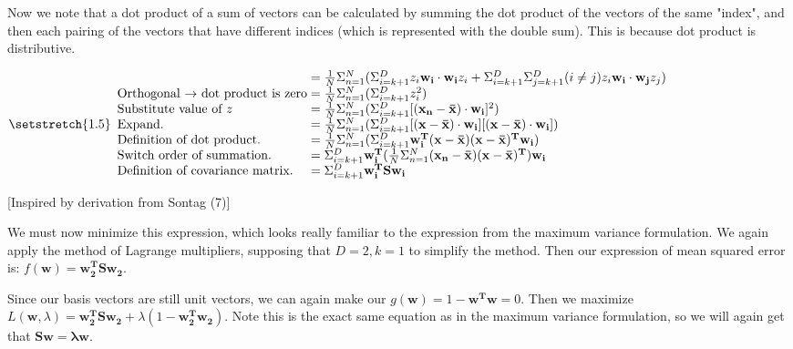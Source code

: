 \documentclass{article}
\begin{document}
\vspace{2mm}
\noindent Now we note that a dot product of a sum of vectors can be calculated by summing the dot product of the vectors of the same "index", and then each pairing of the vectors that have different indices (which is represented with the double sum). This is because dot product is distributive.

$
\setstretch{1.5}
\begin{array}{l@{{}\mathrel{=}{}}l}
    &\frac{1}{N}\Sigma_{n=1}^{N}(\Sigma_{i=k+1}^{D}z_i\mathbf{w_i}\cdot\mathbf{w_i}z_i + \Sigma_{i=k+1}^{D} \Sigma_{j=k+1}^{D}(i\neq j)z_i\mathbf{w_i \cdot w_j}z_j)\\
    \text{Orthogonal $\rightarrow$ dot product is zero}&\frac{1}{N}\Sigma_{n=1}^{N}(\Sigma_{i=k+1}^{D}z_{i}^2)\\
    \text{Substitute value of $z$}&\frac{1}{N}\Sigma_{n=1}^{N}(\Sigma_{i=k+1}^{D}[(\mathbf{x_n - \bar{x}}) \cdot \mathbf{w_i}]^2)\\
    \text{Expand.}&\frac{1}{N}\Sigma_{n=1}^{N}(\Sigma_{i=k+1}^{D}[(\mathbf{x - \bar{x}})\cdot \mathbf{w_i}][(\mathbf{x - \bar{x}})\cdot \mathbf{w_i}])\\
    \text{Definition of dot product.}&\frac{1}{N}\Sigma_{n=1}^{N}(\Sigma_{i=k+1}^{D}\mathbf{w_{i}^{T}(x-\bar{x})(x-\bar{x})^{T}w_i})\\
    \text{Switch order of summation.}&\Sigma_{i=k+1}^{D}\mathbf{w_{i}^{T}}(\frac{1}{N}\Sigma_{n=1}^{N}\mathbf{(x_n - \bar{x})(x-\bar{x})^{T}})\mathbf{w_i}\\
    \text{Definition of covariance matrix.}&\Sigma_{i=k+1}^{D}\mathbf{w_{i}^{T}Sw_i}
\end{array}$

\hfill [Inspired by derivation from Sontag (7)]


\vspace{2mm}
\noindent We must now minimize this expression, which looks really familiar to the expression from the maximum variance formulation. We again apply the method of Lagrange multipliers, supposing that $D = 2, k = 1$ to simplify the method. Then our expression of mean squared error is: $f(\mathbf{w}) = \mathbf{w_{2}^{T}Sw_{2}}$.

\vspace{2mm}
\noindent Since our basis vectors are still unit vectors, we can again make our $g(\mathbf{w}) = 1 - \mathbf{w^{T}w} = 0$. Then we maximize $L(\mathbf{w}, \lambda) = \mathbf{w_{2}^{T}Sw_{2}} + \lambda(1-\mathbf{w_{2}^{T}w_2})$. Note this is the exact same equation as in the maximum variance formulation, so we will again get that $\mathbf{Sw = \lambda w}$.
\end{document}
